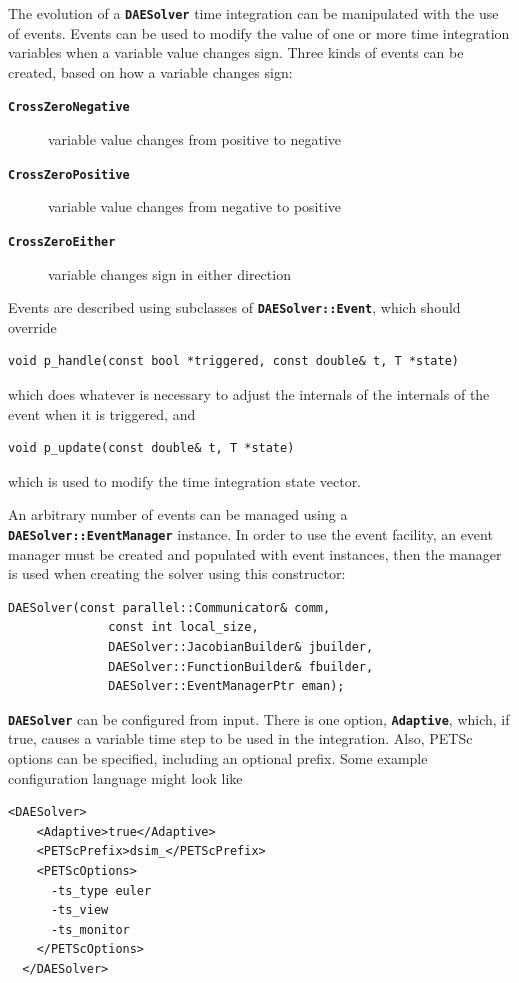 The evolution of a \texttt{\textbf{DAESolver}} time integration can be
manipulated with the use of events.  Events can be used to modify the
value of one or more time integration variables when a variable value
changes sign.  Three kinds of events can be created, based on how a
variable changes sign:
\begin{description}
\item[\texttt{\textbf{CrossZeroNegative}}]
  variable value changes from positive to negative
\item[\texttt{\textbf{CrossZeroPositive}}]
  variable value changes from negative to positive
\item[\texttt{\textbf{CrossZeroEither}}]
  variable changes sign in either direction
\end{description}
Events are described using subclasses of
\texttt{\textbf{DAESolver::Event}}, which should override
{ \color{red}
\begin{Verbatim}[fontseries=b]
   void p_handle(const bool *triggered, const double& t, T *state)
\end{Verbatim}
}
which does whatever is necessary to adjust the internals of the
internals of the event when it is triggered, and
{ \color{red}
\begin{Verbatim}[fontseries=b]
   void p_update(const double& t, T *state)
\end{Verbatim}
}
which is used to modify the time integration state vector.

An arbitrary number of events
can be managed using a \texttt{\textbf{DAESolver::EventManager}}
instance.  In order to use the event facility, an event manager must
be created and populated with event instances, then the manager is
used when creating the solver using this constructor:

{ \color{red}
\begin{Verbatim}[fontseries=b]
    DAESolver(const parallel::Communicator& comm, 
              const int local_size,
              DAESolver::JacobianBuilder& jbuilder,
              DAESolver::FunctionBuilder& fbuilder,
              DAESolver::EventManagerPtr eman);
\end{Verbatim}
}

\textbf{\texttt{DAESolver}} can be configured from input.  There is
one option, \texttt{\textbf{Adaptive}}, which, if true, causes a
variable time step to be used in the integration.  Also, PETSc options
can be specified, including an optional prefix.  Some example configuration
language might look like

{ \color{blue}
\begin{Verbatim}[fontseries=b]
  <DAESolver>
    <Adaptive>true</Adaptive>
    <PETScPrefix>dsim_</PETScPrefix>
    <PETScOptions>
      -ts_type euler
      -ts_view
      -ts_monitor
    </PETScOptions>
  </DAESolver>
\end{Verbatim}
}
\hyperlink{topDoc}{\color{blue}{Top}}


